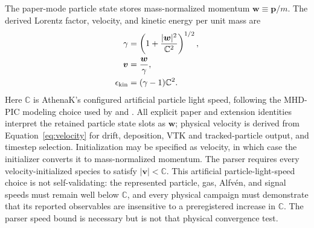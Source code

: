 \documentclass[twocolumn]{aastex701}
\begin{document}
The paper-mode particle state stores mass-normalized momentum
$\boldsymbol{w}\equiv\boldsymbol{p}/m$. The derived Lorentz factor, velocity,
and kinetic energy per unit mass are
\begin{align}
\gamma &=
\left(1+\frac{|\boldsymbol{w}|^2}{\mathbb{C}^2}\right)^{1/2},
\label{eq:gamma}\\
\boldsymbol{v} &= \frac{\boldsymbol{w}}{\gamma},
\label{eq:velocity}\\
\epsilon_{\rm kin} &= (\gamma-1)\mathbb{C}^2.
\label{eq:kinetic-energy}
\end{align}
Here $\mathbb{C}$ is AthenaK's configured artificial particle light speed,
following the MHD-PIC modeling choice used by \citet{BaiEtAl2015} and
\citet{SunBai2023}.
All explicit paper and extension identities interpret the retained particle
state slots as $\boldsymbol{w}$; physical velocity is derived from
Equation~\ref{eq:velocity} for drift, deposition, VTK and tracked-particle
output, and timestep selection. Initialization may be specified as velocity, in
which case the initializer converts it to mass-normalized momentum. The parser
requires every velocity-initialized species to satisfy
$|\boldsymbol{v}|<\mathbb{C}$. This artificial particle-light-speed choice is
not self-validating: the represented particle, gas, Alfv\'en, and signal speeds
must remain well below $\mathbb{C}$, and every physical campaign must
demonstrate that its reported observables are insensitive to a preregistered
increase in $\mathbb{C}$. The parser speed bound is necessary but is not that
physical convergence test.
\end{document}

